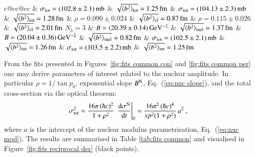 \begin{table}
\begin{center}
\begin{tabular}{c@{\hskip20pt}cc@{\hskip20pt}cc}
			& $\sigma_{\rm tot} = (102.8 \pm 2.1)\,{\rm mb}$ & $\sqrt{\langle b^2\rangle_{\rm tot}} = 1.25\,{\rm fm}$	& $\sigma_{\rm tot} = (104.13 \pm 2.3)\,{\rm mb}$ & $\sqrt{\langle b^2\rangle_{\rm tot}} = 1.28\,{\rm fm}$	\cr\hline
%                                                                                                                                                                                                                   
 			& $\rho = 0.090 \pm 0.024$ & $\sqrt{\langle b^2\rangle_{\rm el}} = 0.87\,{\rm fm}$						& $\rho = 0.115 \pm 0.026$ & $\sqrt{\langle b^2\rangle_{\rm el}} = 2.01\,{\rm fm}$						\cr
$N_b = 3$	& $B = (20.39 \pm 0.14)\,{\rm GeV^{-2}}$ & $\sqrt{\langle b^2\rangle_{\rm inel}} = 1.37\,{\rm fm}$		& $B = (20.04 \pm 0.36)\,{\rm GeV^{-2}}$ & $\sqrt{\langle b^2\rangle_{\rm inel}} = 0.82\,{\rm fm}$		\cr
			& $\sigma_{\rm tot} = (102.5 \pm 2.1)\,{\rm mb}$ & $\sqrt{\langle b^2\rangle_{\rm tot}} = 1.26\,{\rm fm}$	& $\sigma_{\rm tot} = (103.5 \pm 2.2)\,{\rm mb}$ & $\sqrt{\langle b^2\rangle_{\rm tot}} = 1.25\,{\rm fm}$	\cr\hline
\hline
\end{tabular}
\end{center}
\end{table}


From the fits presented in Figures~\ref{fig:fits common con} and \ref{fig:fits common per} one may derive parameters of interest related to the nuclear amplitude. In particular $\rho = 1 / \tan p_0$, exponential slope $B^{\rm N}$, Eq.~(\ref{eq:nuc slope}), and the total cross-section via the optical theorem:
\begin{equation}
\label{eq:si tot}
\sigma_{\rm tot}^2 = {16\pi\, (\hbar c)^2\over 1 + \rho^2}\, \left. \d\sigma^{\rm N}\over\d t\right|_0
		= {16\pi^2\, (\hbar c)^4\over s p^2 (1+\rho^2)}\, a^2\ ,
\end{equation}
where $a$ is the intercept of the nuclear modulus parametrisation, Eq.~(\ref{eq:nuc mod}). The results are summarised in Table \ref{tab:fits common} and visualised in Figure~\ref{fig:fits reciprocal der} (black points).

